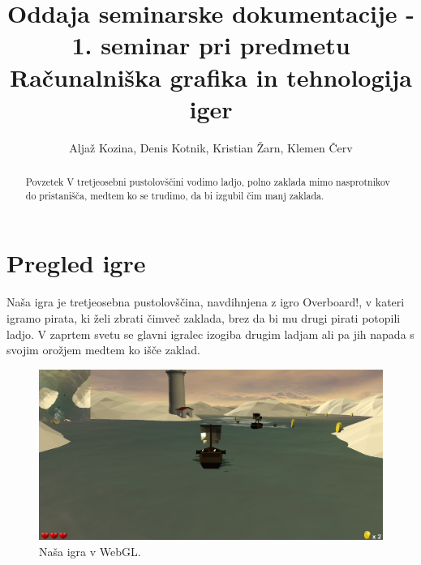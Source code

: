 \documentclass[a4paper]{article}
\begin{document}
\title{Oddaja seminarske dokumentacije - 1. seminar pri predmetu Računalniška grafika in tehnologija iger}

\author{Aljaž Kozina, Denis Kotnik, Kristian Žarn, Klemen Červ}



\maketitle


\begin{abstract}{Povzetek}
V tretjeosebni pustolovščini vodimo ladjo, polno zaklada mimo nasprotnikov do pristanišča, medtem ko se trudimo, da bi izgubil čim manj zaklada.
\end{abstract}



\section{Pregled igre}
Naša igra je tretjeosebna pustolovščina, navdihnjena z igro Overboard!\cite{wiki:Overboard!}, v kateri igramo pirata, ki želi zbrati čimveč zaklada, brez da bi mu drugi pirati potopili ladjo. V zaprtem svetu se glavni igralec izogiba drugim ladjam ali pa jih napada s svojim orožjem medtem ko išče zaklad.

\begin{figure}[H]
    \begin{center}
        \includegraphics[width=\columnwidth]{Screenshot.png}
        \caption{Naša igra v WebGL.} \label{fig:slika}
    \end{center}
\end{figure}
\end{document}
